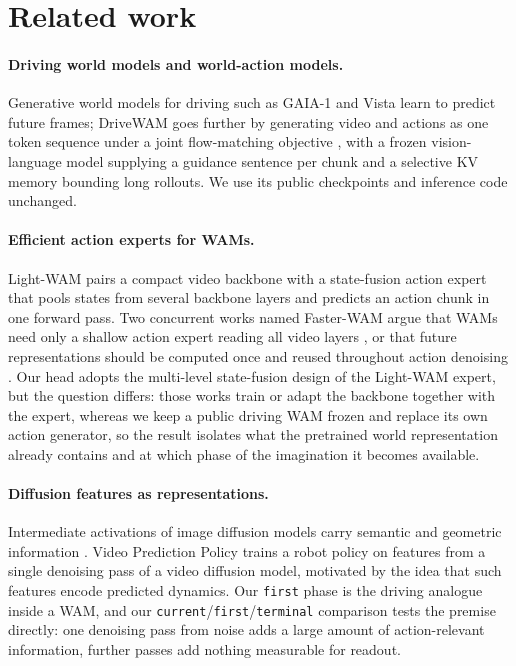 \documentclass[10pt]{article}
\newcommand{\first}{\texttt{first}}
\newcommand{\current}{\texttt{current}}
\newcommand{\terminal}{\texttt{terminal}}
\begin{document}
\section{Related work}
\label{sec:related}

\paragraph{Driving world models and world-action models.} Generative world models for driving such as GAIA-1 \citep{hu2023gaia} and Vista \citep{gao2024vista} learn to predict future frames; DriveWAM \citep{shi2026drivewam} goes further by generating video and actions as one token sequence under a joint flow-matching objective \citep{lipman2023flow}, with a frozen vision-language model supplying a guidance sentence per chunk and a selective KV memory bounding long rollouts. We use its public checkpoints and inference code unchanged.

\paragraph{Efficient action experts for WAMs.} Light-WAM \citep{li2026lightwam} pairs a compact video backbone with a state-fusion action expert that pools states from several backbone layers and predicts an action chunk in one forward pass. Two concurrent works named Faster-WAM argue that WAMs need only a shallow action expert reading all video layers \citep{ma2026fasterwam}, or that future representations should be computed once and reused throughout action denoising \citep{zhao2026fasterwam}. Our head adopts the multi-level state-fusion design of the Light-WAM expert, but the question differs: those works train or adapt the backbone together with the expert, whereas we keep a public driving WAM frozen and replace its own action generator, so the result isolates what the pretrained world representation already contains and at which phase of the imagination it becomes available.

\paragraph{Diffusion features as representations.} Intermediate activations of image diffusion models carry semantic and geometric information \citep{xiang2023diffusionfeatures,tang2023dift}. Video Prediction Policy \citep{hu2025vpp} trains a robot policy on features from a single denoising pass of a video diffusion model, motivated by the idea that such features encode predicted dynamics. Our \first{} phase is the driving analogue inside a WAM, and our \current{}/\first{}/\terminal{} comparison tests the premise directly: one denoising pass from noise adds a large amount of action-relevant information, further passes add nothing measurable for readout.
\end{document}
